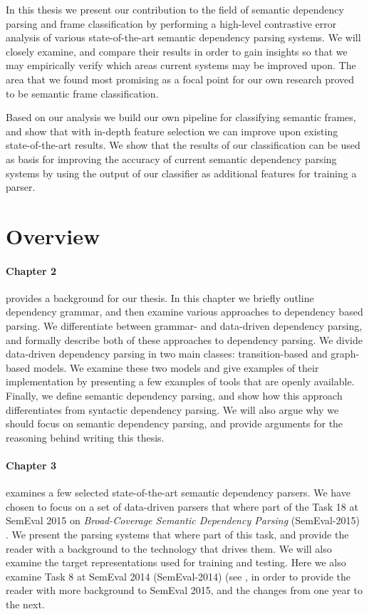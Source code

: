 In this thesis we present our contribution to the field of semantic dependency parsing and frame classification by performing a high-level contrastive error analysis of various state-of-the-art semantic dependency parsing systems. We will closely examine, and compare their results in order to gain insights so that we may empirically verify which areas current systems may be improved upon. The area that we found most promising as a focal point for our own research proved to be semantic frame classification.

Based on our analysis we build our own pipeline for classifying semantic frames, and show that with in-depth feature selection we can improve upon existing state-of-the-art results. We show that the results of our classification can be used as basis for improving the accuracy of current semantic dependency parsing systems by using the output of our classifier as additional features for training a parser.

\section{Overview} 

\paragraph{Chapter 2} provides a background for our thesis. In this chapter we briefly outline dependency grammar, and then examine various approaches to dependency based parsing. We differentiate between grammar- and data-driven dependency parsing, and formally describe both of these approaches to dependency parsing. We divide data-driven dependency parsing in two main classes: transition-based and graph-based models. We examine these two models and give examples of their implementation by presenting a few examples of tools that are openly available. Finally, we define semantic dependency parsing, and show how this approach differentiates from syntactic dependency parsing. We will also argue why we should focus on semantic dependency parsing, and provide arguments for the reasoning behind writing this thesis.

\paragraph{Chapter 3} examines a few selected state-of-the-art semantic dependency parsers. We have chosen to focus on a set of data-driven parsers that where part of the Task 18 at SemEval 2015 on \textit{Broad-Coverage Semantic Dependency Parsing} (SemEval-2015) \cite{Oepen:15}. We present the parsing systems that where part of this task, and provide the reader with a background to the technology that drives them. We will also examine the target representations used for training and testing. Here we also examine Task 8 at SemEval 2014 (SemEval-2014) (see , in order to provide the reader with more background to SemEval 2015, and the changes from one year to the next.

